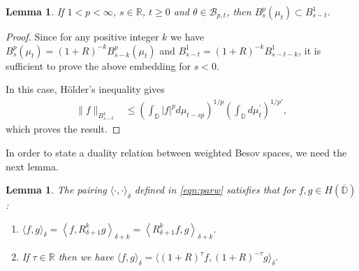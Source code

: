 \documentclass[12pt,twoside,leqno,final]{amsart}
\theoremstyle{plain}
\newtheorem{lem}[thm]{Lemma}
\begin{document}
\begin{lem}\label{lem:embed} 
If $1<p<\infty$, $s\in{{\mathbb R}}$, $t\ge 0$ and $\theta\in {{\mathcal B}}_{p,t}$, then  
$ B^p_s(\mu_t)\subset B^1_{s-t}$.
\end{lem}

\begin{proof}
Since for any positive integer $k$ we have $B^p_s(\mu_t)=(1+R)^{-k} B^p_{s-k}(\mu_t)$ and
 $B^{1}_{s-t}=(1+R)^{-k}B^{1}_{s-t-k}$, it is sufficient to prove the above embedding for $s<0$.

In this case, H\"older's inequality gives
\begin{align*}
\|f\|_{ B^1_{s-t}}&\le \left( \int_{{\mathbb D}} |f|^pd\mu_{t-sp}\right)^{1/p}\left( \int_{{\mathbb D}} d\mu^{\prime}_{t}\right)^{1/p'},
\end{align*}
which proves the result.
\end{proof}

In order to state a duality relation between weighted Besov spaces, we need the next lemma.

\begin{lem} \label{lem:ptspar}
The pairing $\langle \cdot,\cdot \rangle_\delta$ defined in \eqref{eqn:parw} satisfies that for  $f,g\in H(\overline{{\mathbb D}})$:
\begin{enumerate}
\item \label{item:ptspar1}
$\displaystyle{
\langle f,g\rangle_\delta 
= \left\langle f,R_{\delta +1}^k g\right\rangle_{\delta+k} 
= \left\langle R_{\delta +1}^k f,g\right\rangle_{\delta+k}. 
}$

\item \label{item:ptspar2}
If $\tau \in{{\mathbb R}}$ then we have
$
\langle f,g\rangle_\delta =\langle (1+R)^\tau f,(1+R)^{-\tau} g\rangle_\delta. 
$
\end{enumerate}
\end{lem}
\end{document}
